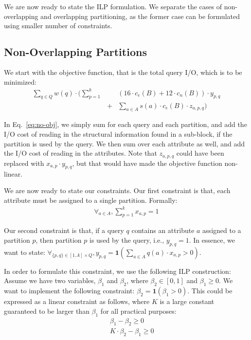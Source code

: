 We are now ready to state the ILP formulation. We separate the cases of
non-overlapping and overlapping partitioning, as the former case can be
formulated using smaller number of constraints.

\subsection{Non-Overlapping Partitions}\label{subsubsec:nov-ilp}
\noindent
We start with the objective function, that is the total query I/O, which is to
be minimized:
\begin{eqnarray}
\sum_{q\in Q} w(q) \cdot \Big(\sum_{p=1}^{k} \!\!&&\!\! (16\cdot c_e(B) + 12\cdot c_n(B))\cdot
y_{p,q}\nonumber\\ 
&+& \sum_{a\in A} s(a)\cdot c_e(B)\cdot z_{a,p,q}\Big)\label{eq:no-obj}
\end{eqnarray}

In Eq.~\ref{eq:no-obj}, we simply sum for each query and each partition, and
add the I/O cost of reading in the structural information found in a
sub-block, if the partition is used by the query. We then sum over each
attribute as well, and add the I/O cost of reading in the attributes. Note
that $z_{a,p,q}$ could have been replaced with $x_{a,p}\cdot y_{p,q}$, but
that would have made the objective function non-linear. 

We are now ready to state our constraints. Our first constraint is that, each
attribute must be assigned to a single partition. Formally:
\begin{eqnarray}
\forall_{a\in A}, \sum_{p=1}^{k} x_{a,p} = 1
\end{eqnarray}

Our second constraint is that, if a query $q$ contains an attribute $a$
assigned to a partition $p$, then partition $p$ is used by the query, i.e.,
$y_{p,q}=1$. In essence, we want to state: $\forall_{\{p,q\}\in [1..k]\times
Q}, y_{p,q} = \mathbf{1}(\sum_{a\in A} q(a)\cdot x_{a,p}>0)$. 

In order to formulate this constraint, we use the following ILP  construction:
Assume we have two variables, $\beta_1$ and $\beta_2$, where $\beta_2\in[0,1]$
and $\beta_1\geq 0$. We want to implement the following constraint: $\beta_2 =
\mathbf{1}(\beta_1 > 0)$. This could be expressed as a linear constraint as
follows, where $K$ is a large constant guaranteed to be larger than $\beta_1$
for all practical purposes:
\begin{eqnarray}
&& \beta_1 - \beta_2 \geq 0\nonumber\\
&& K\cdot\beta_2 - \beta_1 \geq 0\label{eq:beta-ilp}
\end{eqnarray}

